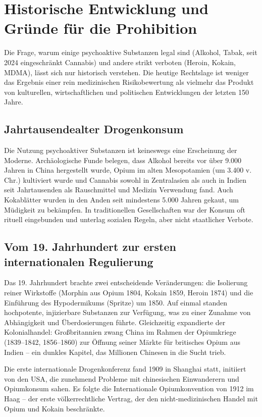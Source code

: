\documentclass[11pt,a4paper]{article}
\begin{document}
	\section{Historische Entwicklung und Gründe für die Prohibition}
	
	Die Frage, warum einige psychoaktive Substanzen legal sind (Alkohol, Tabak, seit 2024 eingeschränkt Cannabis) und andere strikt verboten (Heroin, Kokain, MDMA), lässt sich nur historisch verstehen. Die heutige Rechtslage ist weniger das Ergebnis einer rein medizinischen Risikobewertung als vielmehr das Produkt von kulturellen, wirtschaftlichen und politischen Entwicklungen der letzten 150 Jahre.
	
	\subsection{Jahrtausendealter Drogenkonsum}
	
	Die Nutzung psychoaktiver Substanzen ist keineswegs eine Erscheinung der Moderne. Archäologische Funde belegen, dass Alkohol bereits vor über 9.000 Jahren in China hergestellt wurde, Opium im alten Mesopotamien (um 3.400 v. Chr.) kultiviert wurde und Cannabis sowohl in Zentralasien als auch in Indien seit Jahrtausenden als Rauschmittel und Medizin Verwendung fand. Auch Kokablätter wurden in den Anden seit mindestens 5.000 Jahren gekaut, um Müdigkeit zu bekämpfen. In traditionellen Gesellschaften war der Konsum oft rituell eingebunden und unterlag sozialen Regeln, aber nicht staatlicher Verbote.
	
	\subsection{Vom 19. Jahrhundert zur ersten internationalen Regulierung}
	
	Das 19. Jahrhundert brachte zwei entscheidende Veränderungen: die Isolierung reiner Wirkstoffe (Morphin aus Opium 1804, Kokain 1859, Heroin 1874) und die Einführung des Hypodermikums (Spritze) um 1850. Auf einmal standen hochpotente, injizierbare Substanzen zur Verfügung, was zu einer Zunahme von Abhängigkeit und Überdosierungen führte. Gleichzeitig expandierte der Kolonialhandel: Großbritannien zwang China im Rahmen der Opiumkriege (1839–1842, 1856–1860) zur Öffnung seiner Märkte für britisches Opium aus Indien – ein dunkles Kapitel, das Millionen Chinesen in die Sucht trieb.
	
	Die erste internationale Drogenkonferenz fand 1909 in Shanghai statt, initiiert von den USA, die zunehmend Probleme mit chinesischen Einwanderern und Opiumkonsum sahen. Es folgte die Internationale Opiumkonvention von 1912 im Haag – der erste völkerrechtliche Vertrag, der den nicht-medizinischen Handel mit Opium und Kokain beschränkte.
	
\end{document}
